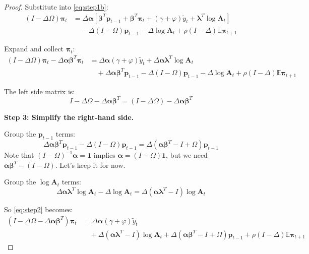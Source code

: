 \documentclass[12pt]{article}
\begin{document}
\begin{proof}
Substitute into \eqref{eq:step1b}:
\begin{align}
    (I-\Delta\Omega)\bm{\pi}_t &= \Delta\bm{\alpha}\left[\bm{\beta}^T\bm{p}_{t-1} + \bm{\beta}^T\bm{\pi}_t + (\gamma+\varphi)\tilde{y}_t + \bm{\lambda}^T\log\mathbf{A}_t\right] \nonumber\\
    &\quad - \Delta(I-\Omega)\bm{p}_{t-1} - \Delta\log\mathbf{A}_t + \rho(I-\Delta)\mathbb{E}\bm{\pi}_{t+1}
\end{align}

Expand and collect $\bm{\pi}_t$:
\begin{align}
    (I-\Delta\Omega)\bm{\pi}_t - \Delta\bm{\alpha}\bm{\beta}^T\bm{\pi}_t &= \Delta\bm{\alpha}(\gamma+\varphi)\tilde{y}_t + \Delta\bm{\alpha}\bm{\lambda}^T\log\mathbf{A}_t \nonumber\\
    &\quad + \Delta\bm{\alpha}\bm{\beta}^T\bm{p}_{t-1} - \Delta(I-\Omega)\bm{p}_{t-1} - \Delta\log\mathbf{A}_t + \rho(I-\Delta)\mathbb{E}\bm{\pi}_{t+1} \label{eq:step2}
\end{align}

The left side matrix is:
\begin{equation}
    I - \Delta\Omega - \Delta\bm{\alpha}\bm{\beta}^T = (I-\Delta\Omega) - \Delta\bm{\alpha}\bm{\beta}^T
    \label{eq:lhsmatrix}
\end{equation}

\medskip
\textbf{Step 3: Simplify the right-hand side.}

Group the $\bm{p}_{t-1}$ terms:
\begin{equation}
    \Delta\bm{\alpha}\bm{\beta}^T\bm{p}_{t-1} - \Delta(I-\Omega)\bm{p}_{t-1} = \Delta(\bm{\alpha}\bm{\beta}^T - I + \Omega)\bm{p}_{t-1}
\end{equation}
Note that $(I-\Omega)^{-1}\bm{\alpha} = \mathbf{1}$ implies $\bm{\alpha} = (I-\Omega)\mathbf{1}$, but we need $\bm{\alpha}\bm{\beta}^T - (I-\Omega)$. Let's keep it for now.

Group the $\log\mathbf{A}_t$ terms:
\begin{equation}
    \Delta\bm{\alpha}\bm{\lambda}^T\log\mathbf{A}_t - \Delta\log\mathbf{A}_t = \Delta(\bm{\alpha}\bm{\lambda}^T - I)\log\mathbf{A}_t
\end{equation}

So \eqref{eq:step2} becomes:
\begin{align}
    (I-\Delta\Omega - \Delta\bm{\alpha}\bm{\beta}^T)\bm{\pi}_t &= \Delta\bm{\alpha}(\gamma+\varphi)\tilde{y}_t \nonumber\\
    &\quad + \Delta(\bm{\alpha}\bm{\lambda}^T - I)\log\mathbf{A}_t + \Delta(\bm{\alpha}\bm{\beta}^T - I + \Omega)\bm{p}_{t-1} + \rho(I-\Delta)\mathbb{E}\bm{\pi}_{t+1}
    \label{eq:step3}
\end{align}


\end{proof}
\end{document}
